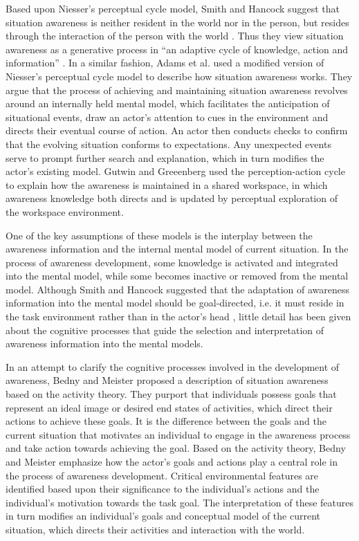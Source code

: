 Based upon Niesser's perceptual cycle model, Smith and Hancock suggest that situation awareness is neither resident in the world nor in the person, but resides through the interaction of the person with the world \cite{Smith1995}. Thus they view situation awareness as a generative process in ``an adaptive cycle of knowledge, action and information'' \cite{Smith1995}. In a similar fashion, Adams et al. \cite{Adams1995} used a modified version of Niesser's perceptual cycle model to describe how situation awareness works. They argue that the process of achieving and maintaining situation awareness revolves around an internally held mental model, which facilitates the anticipation of situational events, draw an actor's attention to cues in the environment and directs their eventual course of action. An actor then conducts checks to confirm that the evolving situation conforms to expectations. Any unexpected events serve to prompt further search and explanation, which in turn modifies the actor's existing model. Gutwin and Greeenberg \cite{Gutwin2002} used the perception-action cycle to explain how the awareness is maintained in a shared workspace, in which awareness knowledge both directs and is updated by perceptual exploration of the workspace environment.

One of the key assumptions of these models is the interplay between the awareness information and the internal mental model of current situation. In the process of awareness development, some knowledge is activated and integrated into the mental model, while some becomes inactive or removed from the mental model. Although Smith and Hancock suggested that the adaptation of awareness information into the mental model should be goal-directed, i.e. it must reside in the task environment rather than in the actor's head \cite{Smith1995}, little detail has been given about the cognitive processes that guide the selection and interpretation of awareness information into the mental models.

In an attempt to clarify the cognitive processes involved in the development of awareness, Bedny and Meister \cite{Bedny1999} proposed a description of situation awareness based on the activity theory. They purport that individuals possess goals that represent an ideal image or desired end states of activities, which direct their actions to achieve these goals. It is the difference between the goals and the current situation that motivates an individual to engage in the awareness process and take action towards achieving the goal. Based on the activity theory, Bedny and Meister emphasize how the actor's goals and actions play a central role in the process of awareness development. Critical environmental features are identified based upon their significance to the individual's actions and the individual's motivation towards the task goal. The interpretation of these features in turn modifies an individual's goals and conceptual model of the current situation, which directs their activities and interaction with the world.

